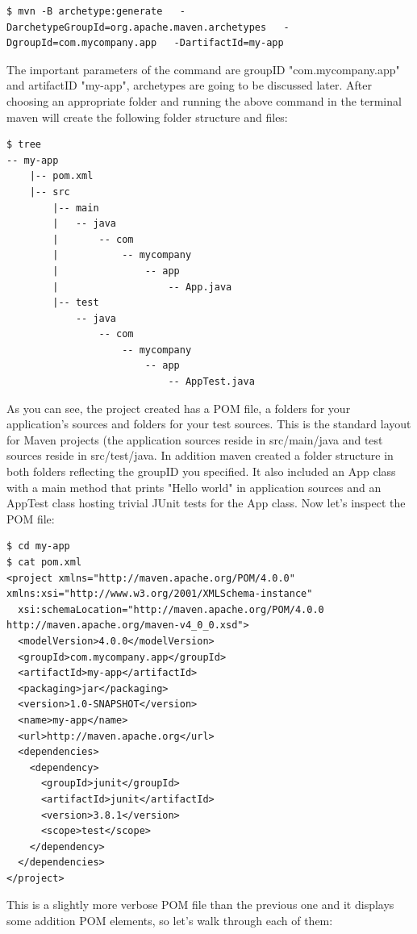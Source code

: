 \documentclass{article}
\begin{document}
\begin{lstlisting}
$ mvn -B archetype:generate   -DarchetypeGroupId=org.apache.maven.archetypes   -DgroupId=com.mycompany.app   -DartifactId=my-app
\end{lstlisting}

The  important parameters of the command are groupID "com.mycompany.app" and
artifactID "my-app", archetypes are going to be discussed later. After
choosing an appropriate folder and running the above command in the
terminal maven will create the following folder structure and files: 

\begin{lstlisting}
$ tree
-- my-app
    |-- pom.xml
    |-- src
        |-- main
        |   -- java
        |       -- com
        |           -- mycompany
        |               -- app
        |                   -- App.java
        |-- test
            -- java
                -- com
                    -- mycompany
                        -- app
                            -- AppTest.java
\end{lstlisting}

As you can see, the project created has a POM file, a
folders for your application's sources and folders for your
test sources. This is the standard layout for Maven projects (the
application sources reside in src/main/java and test
sources reside in src/test/java.
In addition maven created a folder structure in both folders
reflecting the groupID you specified. It also included an App class
with a main method that prints "Hello world" in application sources
and an AppTest class hosting trivial JUnit tests for the App
class. Now let's inspect the POM file:

\begin{lstlisting}
$ cd my-app
$ cat pom.xml
<project xmlns="http://maven.apache.org/POM/4.0.0" xmlns:xsi="http://www.w3.org/2001/XMLSchema-instance"
  xsi:schemaLocation="http://maven.apache.org/POM/4.0.0 http://maven.apache.org/maven-v4_0_0.xsd">
  <modelVersion>4.0.0</modelVersion>
  <groupId>com.mycompany.app</groupId>
  <artifactId>my-app</artifactId>
  <packaging>jar</packaging>
  <version>1.0-SNAPSHOT</version>
  <name>my-app</name>
  <url>http://maven.apache.org</url>
  <dependencies>
    <dependency>
      <groupId>junit</groupId>
      <artifactId>junit</artifactId>
      <version>3.8.1</version>
      <scope>test</scope>
    </dependency>
  </dependencies>
</project>
\end{lstlisting}

This is a slightly more verbose POM file than the previous one and it
displays some addition POM elements, so let's walk through each of them:
\end{document}
